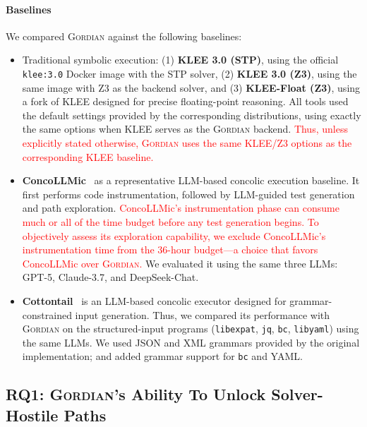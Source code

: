\documentclass[acmsmall,screen,nonacm]{acmart}
\newcommand{\rev}[1]{\textcolor{red}{#1}}
\newcommand{\rev}[1]{#1}
\newcommand{\projName}{\textsc{Gordian}\xspace}
\theoremstyle{definition}
\begin{document}
\paragraph*{Baselines} We compared \projName against the following baselines:
\begin{itemize}
\item Traditional symbolic execution: (1) \textbf{KLEE 3.0 (STP)}, using the official \texttt{klee:3.0} Docker image with the STP solver, (2) \textbf{KLEE 3.0 (Z3)}, using the same image with Z3 as the backend solver, and (3) \textbf{KLEE-Float (Z3)}, using a fork of KLEE \cite{kleeFloat} designed for precise floating-point reasoning. All tools used the default settings provided by the corresponding distributions, using exactly the same options when KLEE serves as the \projName backend. \rev{Thus, unless explicitly stated otherwise, \projName{} uses the same KLEE/Z3 options as the corresponding KLEE baseline.}
\item \textbf{ConcoLLMic}~\cite{concollmic} as a representative LLM-based concolic execution baseline. It first performs code instrumentation, followed by LLM-guided test generation and path exploration. \rev{ConcoLLMic's instrumentation phase can consume much or all of the time budget before any test generation begins. To objectively assess its exploration capability, we exclude ConcoLLMic's instrumentation time from the 36-hour budget---a choice that favors ConcoLLMic over \projName{}.} We evaluated it using the same three LLMs: GPT-5, Claude-3.7, and DeepSeek-Chat.
\item \textbf{Cottontail}~\cite{cottontail} is an LLM-based concolic executor designed for grammar-constrained input generation. Thus, we compared its performance with \projName on the structured-input programs (\texttt{libexpat}, \texttt{jq}, \texttt{bc}, \texttt{libyaml}) using the same LLMs. We used JSON and XML grammars provided by the original implementation; and added grammar support for \texttt{bc} and YAML.
\end{itemize}

\subsection{RQ1: \projName's Ability To Unlock Solver-Hostile Paths}
\end{document}
